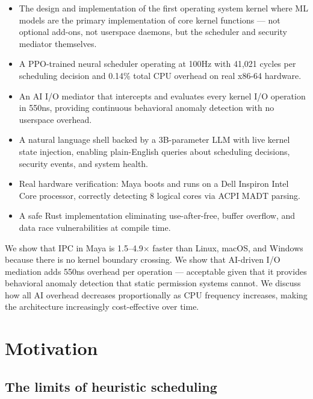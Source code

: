 \documentclass[letterpaper,twocolumn,10pt]{article}
\begin{document}
\begin{itemize}
\item The design and implementation of the first
  operating system kernel where ML models are
  the primary implementation of core kernel
  functions --- not optional add-ons, not
  userspace daemons, but the scheduler and
  security mediator themselves.

\item A PPO-trained neural scheduler operating
  at 100Hz with 41,021 cycles per scheduling
  decision and 0.14\% total CPU overhead on
  real x86-64 hardware.

\item An AI I/O mediator that intercepts and
  evaluates every kernel I/O operation in
  550ns, providing continuous behavioral
  anomaly detection with no userspace overhead.

\item A natural language shell backed by a
  3B-parameter LLM with live kernel state
  injection, enabling plain-English queries
  about scheduling decisions, security events,
  and system health.

\item Real hardware verification: Maya boots
  and runs on a Dell Inspiron Intel Core
  processor, correctly detecting 8 logical
  cores via ACPI MADT parsing.

\item A safe Rust implementation eliminating
  use-after-free, buffer overflow, and data
  race vulnerabilities at compile time.
\end{itemize}

We show that IPC in Maya is 1.5--4.9$\times$
faster than Linux, macOS, and Windows because
there is no kernel boundary crossing. We show
that AI-driven I/O mediation adds 550ns overhead
per operation --- acceptable given that it
provides behavioral anomaly detection that
static permission systems cannot. We discuss
how all AI overhead decreases proportionally
as CPU frequency increases, making the
architecture increasingly cost-effective over
time.

\section{Motivation}

\subsection{The limits of heuristic scheduling}
\end{document}
